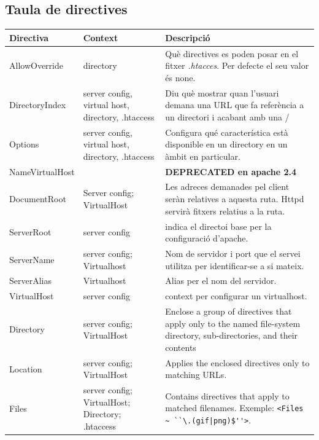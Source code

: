 \documentclass[a4paper, 11pt]{article}
\begin{document}
\subsection{Taula de directives}
\begin{longtable}{|p{4cm}|p{3cm}|p{5cm}|}
\hline
\textbf{Directiva} & \textbf{Context} & \textbf{Descripció} \\
\hline
AllowOverride & directory & Què directives es poden posar en el fitxer \textit{.htacces}. Per defecte el seu valor \'es none.\\
\hline
DirectoryIndex & server config, virtual host, directory, .htaccess & Diu què mostrar quan l'usuari demana una URL que fa referència a un directori i acabant amb una \slash\\
\hline
Options & server config, virtual host, directory, .htaccess & Configura qu\'e característica està disponible en un directory en un àmbit en particular.\\
\hline
NameVirtualHost & & \textbf{DEPRECATED en apache 2.4}\\
\hline
DocumentRoot & Server config; VirtualHost& Les adreces demanades pel client seràn relatives a aquesta ruta. Httpd servirà fitxers relatius a la ruta.\\
\hline
ServerRoot & server config& indica el directoi base per la configuració d'apache.\\
\hline
ServerName & server config; Virtualhost& Nom de servidor i port que el servei utilitza per identificar-se a si mateix.\\
\hline
ServerAlias & Virtualhost& Alias per el nom del servidor.\\
\hline
VirtualHost & server config & context per configurar un virtualhost.\\
\hline
Directory & server config; VirtualHost& Enclose a group of directives that apply only to the named file-system directory, sub-directories, and their contents\\
\hline
Location & server config; VirtualHost& Applies the enclosed directives only to matching URLs.\\
\hline
Files & server config; VirtualHost; Directory; .htaccess& Contains directives that apply to matched filenames. 
Exemple: 
\footnotesize{\verb+<Files ~ ``\.(gif|png)$''>+}.\\

\hline


\end{longtable}
\end{document}
